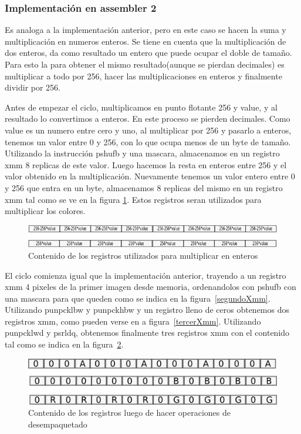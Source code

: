 \documentclass[a4paper]{article}
\begin{document}
\subsubsection{Implementación en assembler 2}

Es analoga a la implementación anterior, pero en este caso se hacen la suma y multiplicación en numeros enteros. Se tiene en cuenta que la multiplicación de dos enteros, da como resultado un entero que puede ocupar el doble de tamaño. Para esto la para obtener el mismo resultado(aunque se pierdan decimales) es multiplicar a todo por 256, hacer las multiplicaciones en enteros y finalmente dividir por 256.

Antes de empezar el ciclo, multiplicamos en punto flotante 256 y value, y al resultado lo convertimos a enteros. En este proceso se pierden decimales. Como value es un numero entre cero y uno, al multiplicar por 256 y pasarlo a enteros, tenemos un valor entre 0 y 256, con lo que ocupa menos de un byte de tamaño. Utilizando la instrucción pshufb y una mascara, almacenamos en un registro xmm 8 replicas de este valor. Luego hacemos la resta en enteros entre 256 y el valor obtenido en la multiplicación. Nuevamente tenemos un valor entero entre 0 y 256 que entra en un byte, almacenamos 8 replicas del mismo en un registro xmm tal como se ve en la figura \ref{256value}. Estos registros seran utilizados para multiplicar los colores.

\begin{figure}[H]
\centering
\includegraphics[scale=0.8]{imagenes/256value.png}
\caption{Contenido de los registros utilizados para multiplicar en enteros}
\label{256value}
\end{figure}

El ciclo comienza igual que la implementación anterior, trayendo a un registro xmm 4 pixeles de la primer imagen desde memoria, ordenandolos con pshufb con una mascara para que queden como se indica en la figura~\ref{segundoXmm}. Utilizando punpcklbw y punpckhbw y un registro lleno de ceros obtenemos dos registros xmm, como pueden verse en a figura~\ref{tercerXmm}. Utilizando punpcklwd y psrldq, obtenemos finalmente tres registros xmm con el contenido tal como se indica en la figura~\ref{xmmAsm2}.

\begin{figure}[H]
\centering
\includegraphics[scale=0.8]{imagenes/xmmAsm2.png}
\caption{Contenido de los registros luego de hacer operaciones de desempaquetado}
\label{xmmAsm2}
\end{figure}
\end{document}

